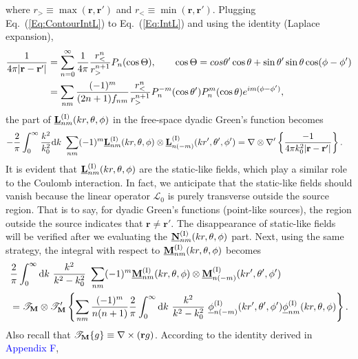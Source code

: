 \documentclass[journal=jacsat,manuscript=article,layout=traditional]{achemso}
\newcommand*\diff{\mathrm{d}}
\newcommand*\br{\mathbf{r}}
\newcommand*\blue[1]{\textcolor{blue}{#1}}
\newcommand{\norF}[1]{\underline{\vb{#1}}}
\newcommand{\RomanI}{\scriptsize\textrm{I}}
\begin{document}
where $r_>\equiv\max(\br,\br')$ and $r_<\equiv\min(\br,\br')$.
Plugging Eq.~(\ref{Eq:ContourIntL}) to Eq.~(\ref{Eq:IntL}) and using the identity (Laplace expansion),
\begin{align}
    \frac{1}{4\pi\abs{\br-\br'}}
    &=
    \sum_{n=0}^\infty\frac{1}{4\pi}\frac{r_<^n}{r_>^{n+1}}P_n(\cos\Theta),
    \qquad \cos\Theta = cos\theta'\cos\theta + 
    \sin\theta'\sin\theta\cos(\phi-\phi')\\
    &=
    \sum_{nm}\frac{(-1)^m}{(2n+1)f_{nm}}\frac{r_<^n}{r_>^{n+1}}P_n^{-m}(\cos\theta') P_n^m(\cos\theta)
    e^{im(\phi-\phi')},
\end{align}
the part of $\norF{L}_{nm}^{(\RomanI)}(kr,\theta,\phi)$ in the free-space dyadic Green's function becomes
\begin{align}
    \label{Eq:Lstatic}
    -\frac{2}{\pi }\int_0^{\infty}\frac{k^2}{k_0^{2}}\diff{k}~\sum_{nm}(-1)^m
    \norF{L}_{nm}^{(\RomanI)}(kr,\theta,\phi)\otimes
    \norF{L}_{n(-m)}^{(\RomanI)}(kr',\theta',\phi')
    &=
    \nabla\otimes\nabla'
    \left\{\frac{-1}{4\pi k_0^2\abs{\br-\br'}}\right\}.
\end{align}
It is evident that $\norF{L}_{nm}^{(\RomanI)}(kr,\theta,\phi)$ are the static-like fields, which play a similar role to the Coulomb interaction.
In fact, we anticipate that the static-like fields should vanish because the linear operator $\mathcal{L}_0$ is purely transverse outside the source region.
That is to say, for dyadic Green's functions (point-like sources), the region outside the source indicates that $\br\neq\br'$.
The disappearance of static-like fields will be verified after we evaluating the $\norF{N}_{nm}^{(\RomanI)}(kr,\theta,\phi)$ part.
Next, using the same strategy, the integral with respect to  $\norF{M}_{nm}^{(\RomanI)}(kr,\theta,\phi)$ becomes
\begin{align}
    \nonumber
    &\frac{2}{\pi}\int_0^{\infty}\diff{k}~\frac{k^2}{k^2-k_0^2}~\sum_{nm}(-1)^m
    \norF{M}_{nm}^{(\RomanI)}(kr,\theta,\phi) \otimes
    \norF{M}_{n(-m)}^{(\RomanI)}(kr',\theta',\phi')\\
    &=
    \mathcal{T}_{\vb{M}}\otimes\mathcal{T}_{\vb{M}}'
    \left\{\sum_{nm}\frac{(-1)^m}{n(n+1)}
    \frac{2}{\pi}\int_0^{\infty}\diff{k}~\frac{k^2}{k^2-k_0^{2}}~
    \underline{\phi}_{n(-m)}^{(\RomanI)}(kr',\theta',\phi')
    \underline{\phi}_{nm}^{(\RomanI)}(kr,\theta,\phi)\right\}.
\end{align}
Also recall that $\mathcal{T}_{\vb{M}}\{g\}\equiv\nabla\times(\vb{r}g)$.
According to the identity derived in \blue{Appendix F},
\end{document}
